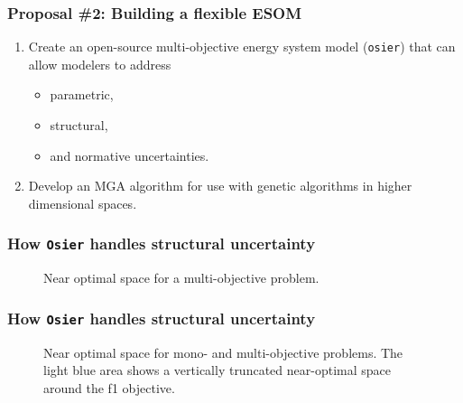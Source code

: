 \begin{frame}
    \frametitle{Proposal \#2: Building a flexible ESOM}

    \begin{enumerate}
        \item Create an open-source multi-objective energy system model (\texttt{osier}) that can allow modelers to address
        \begin{itemize}
            \item parametric,
            \item structural,
            \item and normative uncertainties.
        \end{itemize}
        \item Develop an MGA algorithm for use with genetic algorithms in higher dimensional spaces.
    \end{enumerate}

\end{frame}


\begin{frame}
    \frametitle{How \texttt{Osier} handles structural uncertainty}

        \begin{figure}
            \centering
            \resizebox{0.8\columnwidth}{!}{}
            \caption{Near optimal space for a multi-objective problem.}
            \label{fig:near-opt}
        \end{figure}
\end{frame}

\begin{frame}
    \frametitle{How \texttt{Osier} handles structural uncertainty}


        \begin{figure}
            \centering
            \resizebox{0.8\columnwidth}{!}{}
            \caption{Near optimal space for mono- and multi-objective problems. The light blue area shows
            a vertically truncated near-optimal space around the f1 objective.}
            \label{fig:near-opt-mga}
        \end{figure}

\end{frame}

